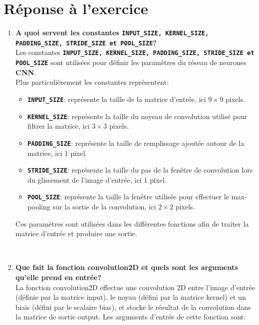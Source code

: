 \section{Réponse à l'exercice}
\begin{enumerate}
  \item {
    \textbf{A quoi servent les constantes \lstinline{INPUT_SIZE, KERNEL_SIZE, PADDING_SIZE, STRIDE_SIZE et POOL_SIZE}?} \vspace{0.2cm}\\
    Les constantes \textbf{\lstinline{INPUT_SIZE, KERNEL_SIZE, PADDING_SIZE, STRIDE_SIZE et POOL_SIZE}} sont utilisées pour définir les paramètres du réseau de neurones \textbf{CNN}. \\
    Plus particulièrement les constantes représentent:
    \begin{itemize}
      \item \textbf{\lstinline{INPUT_SIZE}}: représente la taille de la matrice d'entrée, ici $9 \times 9$ pixels.
      \item \textbf{\lstinline{KERNEL_SIZE}}: représente la taille du noyeau de convolution utilisé pour filtrer la matrice, ici $3 \times 3$ pixels.
      \item \textbf{\lstinline{PADDING_SIZE}}: représente la taille de remplissage ajoutée autour de la matrice, ici 1 pixel.
      \item \textbf{\lstinline{STRIDE_SIZE}}: représente la taille du pas de la fenêtre de convolution lors du glissement de l'image d'entrée, ici 1 pixel.
      \item \textbf{\lstinline{POOL_SIZE}}: représente la taille la fenêtre utilisée pour effectuer le max-pooling sur la sortie de la convolution, ici $2 \times 2$ pixels.
    \end{itemize}
    Ces paramètres sont utilisées dans les différentes fonctions afin de traiter la matrice d'entrée et produire une sortie.
  } \\\newpage
  \item {
    \textbf{Que fait la fonction convolution2D et quels sont les arguments qu'elle prend en entrée?} \vspace{0.2cm}\\ 
    La fonction convolution2D effectue une convolution 2D entre l'image d'entrée (définie par la matrice input), le noyau (défini par la matrice kernel) et un biais (défini par le scalaire bias), et stocke le résultat de la convolution dans la matrice de sortie output.
    Les arguments d'entrée de cette fonction sont:
    \begin{itemize}

\end{itemize}}
\end{enumerate}
